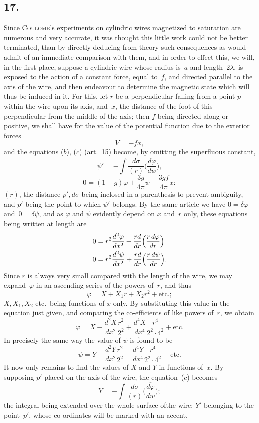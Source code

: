 \documentclass[11pt,notitlepage]{amsart}
\let\Person\textsc
\newcommand\Section[1]{\subsection{{#1}}}
\renewcommand{\phi}{\varphi}
\begin{document}
\Section{17.}
Since \Person{Coulomb}'s experiments on cylindric wires magnetized to saturation
are numerous and very accurate, it was thought this little work could not be
better terminated, than by directly deducing from theory such consequences
as would admit of an immediate comparison with them, and in order to effect
this, we will, in the first place, suppose a cylindric wire whose radius is~$a$
and length~$2\lambda$,
is exposed to the action of a constant force, equal to~$f$, and
directed parallel to the axis of the wire, and then endeavour to determine
the magnetic state which will thus be induced in it. For this, let $r$ be a
perpendicular falling from a point $p$ within the wire upon its axis, and~$x$,
the distance of the foot of this perpendicular from the middle of the axis;
then $f$ being directed along or positive, we shall have for the value of the
potential function due to the exterior forces
\[
V=-fx,
\]
and the equations ($b$), ($c$) (art.~15) become,
by omitting the superfluous constant,
\[
\tag{$b$}
\psi'=-\int\frac{d\sigma}{(r)}\biggl(\frac{\overline{d\phi}}{dw}\biggr),
\]
\[
\tag{$c$}
0=(1-g)\phi+\frac{3g}{4\pi}\psi-\frac{3gf}{4\pi}x:
\]
$(r)$, the distance $p',d\sigma$ being inclosed
in a parenthesis to prevent ambiguity,
and $p'$ being the point to which $\psi'$ belongs. By the same article we have
$0=\delta\phi$ and~$0=\delta\psi$,
and as $\phi$ and $\psi$ evidently depend on $x$ and~$r$ only,
these equations being written at length are
\[
\begin{aligned}
0 &= r^2\frac{d^2\phi}{dx^2}+\frac{rd}{dr}\Bigl(\frac{r\,d\phi}{dr}\Bigr)\\
0 &= r^2\frac{d^2\psi}{dx^2}+\frac{rd}{dr}\Bigl(\frac{r\,d\psi}{dr}\Bigr).
\end{aligned}
\]
Since $r$ is always very small compared with the length of the wire, we may
expand~$\phi$ in an ascending series of the powers of~$r$, and thus
\[
\phi=X+X_1r+X_2r^2+\text{etc.};
\]
$X,X_1,X_2$ etc.\ being functions of $x$ only. By substituting this value in
the equation just given, and comparing the co-efficients of like powers of~$r$,
we obtain
\[
\phi=X-\frac{d^2X}{dx^2}\frac{r^2}{2^2}
+\frac{d^4X}{dx^4}\frac{r^4}{2^2\cdot4^2}
+\text{etc.}
\]
In precisely the same way the value of $\psi$ is found to be
\[
\psi=Y-\frac{d^2Y}{dx^2}\frac{r^2}{2^2}
+\frac{d^4Y}{dx^4}\frac{r^4}{2^2\cdot4^2}
-\text{etc.}
\]
It now only remains to find the values of $X$ and $Y$ in functions of~$x$. By
supposing $p'$ placed on the axis of the wire, the equation~($c$) becomes
\[
Y=-\int\frac{d\sigma}{(r)}\biggl(\frac{\overline{d\phi}}{dw}\biggr);
\]
the integral being extended over the whole surface ofthe wire: $Y'$ belonging
to the point~$p'$, whose co-ordinates will be marked with an accent.
\end{document}
